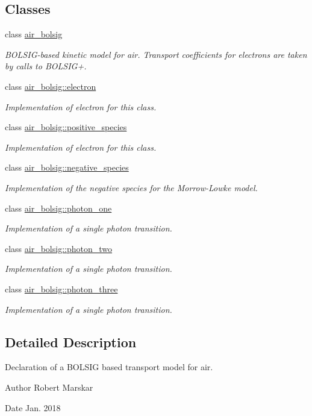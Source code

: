 \subsection*{Classes}
\begin{DoxyCompactItemize}
\item 
class \hyperlink{classair__bolsig}{air\+\_\+bolsig}
\begin{DoxyCompactList}\small\item\em B\+O\+L\+S\+I\+G-\/based kinetic model for air. Transport coefficients for electrons are taken by calls to B\+O\+L\+S\+I\+G+. \end{DoxyCompactList}\item 
class \hyperlink{classair__bolsig_1_1electron}{air\+\_\+bolsig\+::electron}
\begin{DoxyCompactList}\small\item\em Implementation of electron for this class. \end{DoxyCompactList}\item 
class \hyperlink{classair__bolsig_1_1positive__species}{air\+\_\+bolsig\+::positive\+\_\+species}
\begin{DoxyCompactList}\small\item\em Implementation of electron for this class. \end{DoxyCompactList}\item 
class \hyperlink{classair__bolsig_1_1negative__species}{air\+\_\+bolsig\+::negative\+\_\+species}
\begin{DoxyCompactList}\small\item\em Implementation of the negative species for the Morrow-\/\+Lowke model. \end{DoxyCompactList}\item 
class \hyperlink{classair__bolsig_1_1photon__one}{air\+\_\+bolsig\+::photon\+\_\+one}
\begin{DoxyCompactList}\small\item\em Implementation of a single photon transition. \end{DoxyCompactList}\item 
class \hyperlink{classair__bolsig_1_1photon__two}{air\+\_\+bolsig\+::photon\+\_\+two}
\begin{DoxyCompactList}\small\item\em Implementation of a single photon transition. \end{DoxyCompactList}\item 
class \hyperlink{classair__bolsig_1_1photon__three}{air\+\_\+bolsig\+::photon\+\_\+three}
\begin{DoxyCompactList}\small\item\em Implementation of a single photon transition. \end{DoxyCompactList}\end{DoxyCompactItemize}


\subsection{Detailed Description}
Declaration of a B\+O\+L\+S\+IG based transport model for air. 

\begin{DoxyAuthor}{Author}
Robert Marskar 
\end{DoxyAuthor}
\begin{DoxyDate}{Date}
Jan. 2018 
\end{DoxyDate}
